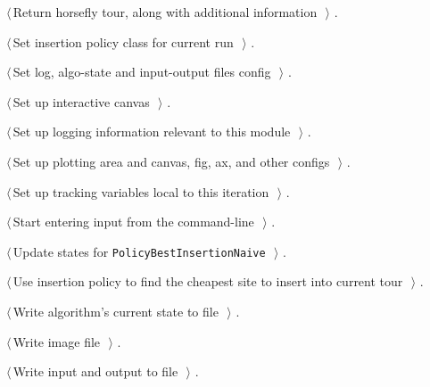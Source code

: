 \documentclass[11.5pt]{report}
\begin{document}
{\begin{list}{}{\setlength{\itemsep}{-\parsep}\setlength{\itemindent}{-\leftmargin}}
\item $\langle\,$Return horsefly tour, along with additional information\nobreak\ {\footnotesize {}}$\,\rangle$ {\footnotesize {\NWtxtRefIn} .}
\item $\langle\,$Set insertion policy class for current run\nobreak\ {\footnotesize {}}$\,\rangle$ {\footnotesize {\NWtxtRefIn} .}
\item $\langle\,$Set log, algo-state and input-output files config\nobreak\ {\footnotesize {}}$\,\rangle$ {\footnotesize {\NWtxtRefIn} .}
\item $\langle\,$Set up interactive canvas\nobreak\ {\footnotesize {}}$\,\rangle$ {\footnotesize {\NWtxtRefIn} .}
\item $\langle\,$Set up logging information relevant to this module\nobreak\ {\footnotesize {}}$\,\rangle$ {\footnotesize {\NWtxtRefIn} .}
\item $\langle\,$Set up plotting area and canvas, fig, ax, and other configs\nobreak\ {\footnotesize {}}$\,\rangle$ {\footnotesize {\NWtxtRefIn} .}
\item $\langle\,$Set up tracking variables local to this iteration\nobreak\ {\footnotesize {}}$\,\rangle$ {\footnotesize {\NWtxtRefIn} .}
\item $\langle\,$Start entering input from the command-line\nobreak\ {\footnotesize {}}$\,\rangle$ {\footnotesize {\NWtxtRefIn} .}
\item $\langle\,$Update states for \texttt{PolicyBestInsertionNaive}\nobreak\ {\footnotesize {}}$\,\rangle$ {\footnotesize {\NWtxtRefIn} .}
\item $\langle\,$Use insertion policy to find the cheapest site to insert into current tour\nobreak\ {\footnotesize {}}$\,\rangle$ {\footnotesize {\NWtxtRefIn} .}
\item $\langle\,$Write algorithm's current state to file\nobreak\ {\footnotesize {}}$\,\rangle$ {\footnotesize {\NWtxtRefIn} .}
\item $\langle\,$Write image file\nobreak\ {\footnotesize {}}$\,\rangle$ {\footnotesize {\NWtxtRefIn} .}
\item $\langle\,$Write input and output to file\nobreak\ {\footnotesize {}}$\,\rangle$ {\footnotesize {\NWtxtRefIn} .}
\end{list}}
\end{document}
